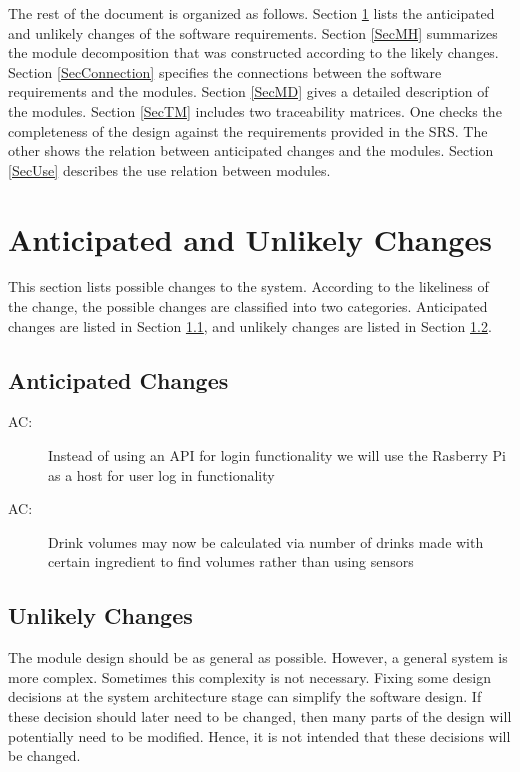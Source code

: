 \documentclass[12pt, titlepage]{article}
\newcounter{acnum}
\newcommand{\actheacnum}{AC\theacnum}
\begin{document}
The rest of the document is organized as follows. Section
\ref{SecChange} lists the anticipated and unlikely changes of the software
requirements. Section \ref{SecMH} summarizes the module decomposition that
was constructed according to the likely changes. Section \ref{SecConnection}
specifies the connections between the software requirements and the
modules. Section \ref{SecMD} gives a detailed description of the
modules. Section \ref{SecTM} includes two traceability matrices. One checks
the completeness of the design against the requirements provided in the SRS. The
other shows the relation between anticipated changes and the modules. Section
\ref{SecUse} describes the use relation between modules.

\section{Anticipated and Unlikely Changes} \label{SecChange}

This section lists possible changes to the system. According to the likeliness
of the change, the possible changes are classified into two
categories. Anticipated changes are listed in Section \ref{SecAchange}, and
unlikely changes are listed in Section \ref{SecUchange}.

\subsection{Anticipated Changes} \label{SecAchange}

\begin{description}
\item[ \actheacnum \label{acHardware}:] Instead of using an API for login functionality we will use the Rasberry Pi as a host for user log in functionality
\item[ \actheacnum \label{acInput}:] Drink volumes may now be calculated via number of drinks made with certain ingredient to find volumes rather than using sensors
\end{description}

\subsection{Unlikely Changes} \label{SecUchange}

The module design should be as general as possible. However, a general system is
more complex. Sometimes this complexity is not necessary. Fixing some design
decisions at the system architecture stage can simplify the software design. If
these decision should later need to be changed, then many parts of the design
will potentially need to be modified. Hence, it is not intended that these
decisions will be changed.
\end{document}
